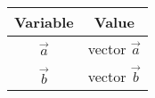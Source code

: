 \begin{tabular}{|c|c|}
\hline
\textbf{Variable} & \textbf{Value} \\
\hline
$\vec a$ & vector $\vec a$ \\
\hline
$\vec b$ & vector $\vec b$ \\
\hline
\end{tabular}